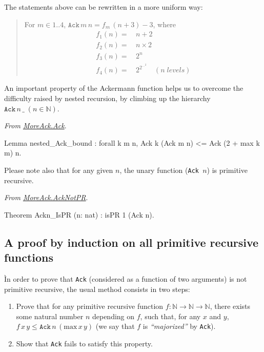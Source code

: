 \begin{remark}
 The statements above can be rewritten in a more uniform way:

 \begin{quote}
   For $m\in 1..4$, $\texttt{Ack}\,m\,n = f_m\,(n+3)-3$, where 
   \begin{align*}
   f_1(n)=&\,n+2 \\
   f_2(n)=&\,n\times 2\\
   f_3(n)=&\,2^n\\
   f_4(n)=&\,2^{2^{\dots^2}}\quad(n\;\textit{levels})
   \end{align*}
 \end{quote}
\end{remark}


An important property of the Ackermann function helps us 
to overcome the difficulty raised by nested recursion, by climbing up the hierarchy $\texttt{Ack}\,n\,\_\;(n\in\mathbb{N})$.


\noindent
\emph{From \href{../theories/html/hydras.MoreAck.Ack.html}{MoreAck.Ack}}.
\begin{Coqsrc}
Lemma nested_Ack_bound : forall k m n, 
    Ack k (Ack m n) <= Ack (2 + max k m) n.
\end{Coqsrc}



Please note also that for any given $n$, the unary function
(\texttt{Ack\,$n$}) is primitive recursive.

\vspace{4pt}

\noindent
\emph{From \href{../theories/html/hydras.MoreAck.AckNotPR.html}{MoreAck.AckNotPR}}.
\begin{Coqsrc}
Theorem Ackn_IsPR (n: nat) : isPR 1 (Ack n).
\end{Coqsrc}



\subsection{A proof by induction on all primitive recursive functions}

Ìn order to prove that \texttt{Ack} (considered as a function of two arguments) is not primitive recursive, the usual method consists in two steps:


\begin{enumerate}
\item Prove that for any primitive recursive function $f:\mathbb{N}\rightarrow\mathbb{N}\rightarrow\mathbb{N}$, there exists some natural number $n$ depending on $f$, such that, for any $x$ and $y$, 
$f\,x\,y \leq \texttt{Ack}\,n\,(\textrm{max}\,x\,y)$ (we say that $f$ is \emph{``majorized''}  by \texttt{Ack}).
\item Show that \texttt{Ack} fails to satisfy this property.
\end{enumerate}

